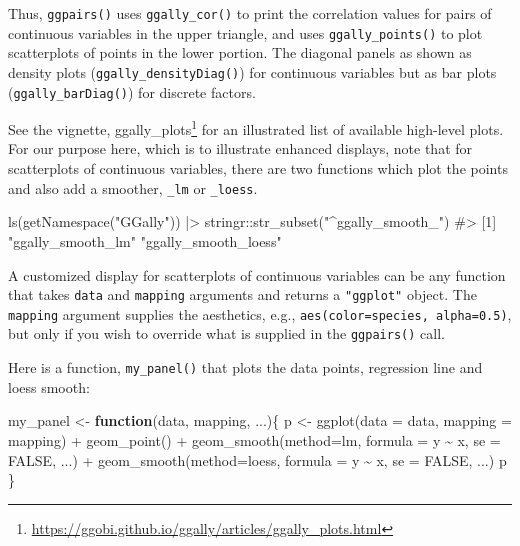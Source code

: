 \documentclass[
  letterpaper,
  10pt,
  krantz2]{krantz}
\makeatletter
\newenvironment{Shaded}{\begin{snugshade}}{\end{snugshade}}
\newcommand{\AttributeTok}[1]{\textcolor[rgb]{0.40,0.45,0.13}{#1}}
\newcommand{\CommentTok}[1]{\textcolor[rgb]{0.37,0.37,0.37}{#1}}
\newcommand{\ConstantTok}[1]{\textcolor[rgb]{0.56,0.35,0.01}{#1}}
\newcommand{\ControlFlowTok}[1]{\textcolor[rgb]{0.00,0.23,0.31}{\textbf{#1}}}
\newcommand{\FunctionTok}[1]{\textcolor[rgb]{0.28,0.35,0.67}{#1}}
\newcommand{\NormalTok}[1]{\textcolor[rgb]{0.00,0.23,0.31}{#1}}
\newcommand{\OtherTok}[1]{\textcolor[rgb]{0.00,0.23,0.31}{#1}}
\newcommand{\SpecialCharTok}[1]{\textcolor[rgb]{0.37,0.37,0.37}{#1}}
\newcommand{\StringTok}[1]{\textcolor[rgb]{0.13,0.47,0.30}{#1}}
\providecommand{\href}[2]{#2\footnote{\url{#1}}}
\newenvironment{kframe}{%
  \medskip{}
  \setlength{\fboxsep}{.8em}
  \def\at@end@of@kframe{}%
  \ifinner\ifhmode%
  \def\at@end@of@kframe{\end{minipage}}%
  \begin{minipage}{\columnwidth}%
  \fi\fi%
  \def\FrameCommand##1{\hskip\@totalleftmargin \hskip-\fboxsep
  \colorbox{shadecolor}{##1}\hskip-\fboxsep
      \hskip-\linewidth \hskip-\@totalleftmargin \hskip\columnwidth}%
  \MakeFramed {\advance\hsize-\width
    \@totalleftmargin\z@ \linewidth\hsize
    \@setminipage}}%
{\par\unskip\endMakeFramed%
  \at@end@of@kframe}
\renewenvironment{Shaded}{\begin{kframe}}{\end{kframe}}
\makeatother
\begin{document}
Thus, \texttt{ggpairs()} uses \texttt{ggally\_cor()} to print the
correlation values for pairs of continuous variables in the upper
triangle, and uses \texttt{ggally\_points()} to plot scatterplots of
points in the lower portion. The diagonal panels as shown as density
plots (\texttt{ggally\_densityDiag()}) for continuous variables but as
bar plots (\texttt{ggally\_barDiag()}) for discrete factors.

See the vignette,
\href{https://ggobi.github.io/ggally/articles/ggally_plots.html}{ggally\_plots}
for an illustrated list of available high-level plots. For our purpose
here, which is to illustrate enhanced displays, note that for
scatterplots of continuous variables, there are two functions which plot
the points and also add a smoother, \texttt{\_lm} or \texttt{\_loess}.

\begin{Shaded}
\begin{Highlighting}[]
\FunctionTok{ls}\NormalTok{(}\FunctionTok{getNamespace}\NormalTok{(}\StringTok{"GGally"}\NormalTok{)) }\SpecialCharTok{|\textgreater{}} 
\NormalTok{  stringr}\SpecialCharTok{::}\FunctionTok{str\_subset}\NormalTok{(}\StringTok{"\^{}ggally\_smooth\_"}\NormalTok{)}
\CommentTok{\#\textgreater{} [1] "ggally\_smooth\_lm"    "ggally\_smooth\_loess"}
\end{Highlighting}
\end{Shaded}

A customized display for scatterplots of continuous variables can be any
function that takes \texttt{data} and \texttt{mapping} arguments and
returns a \texttt{"ggplot"} object. The \texttt{mapping} argument
supplies the aesthetics, e.g., \texttt{aes(color=species,\ alpha=0.5)},
but only if you wish to override what is supplied in the
\texttt{ggpairs()} call.

Here is a function, \texttt{my\_panel()} that plots the data points,
regression line and loess smooth:

\begin{Shaded}
\begin{Highlighting}[]
\NormalTok{my\_panel }\OtherTok{\textless{}{-}} \ControlFlowTok{function}\NormalTok{(data, mapping, ...)\{}
\NormalTok{  p }\OtherTok{\textless{}{-}} \FunctionTok{ggplot}\NormalTok{(}\AttributeTok{data =}\NormalTok{ data, }\AttributeTok{mapping =}\NormalTok{ mapping) }\SpecialCharTok{+} 
    \FunctionTok{geom\_point}\NormalTok{() }\SpecialCharTok{+} 
    \FunctionTok{geom\_smooth}\NormalTok{(}\AttributeTok{method=}\NormalTok{lm, }\AttributeTok{formula =}\NormalTok{ y }\SpecialCharTok{\textasciitilde{}}\NormalTok{ x, }\AttributeTok{se =} \ConstantTok{FALSE}\NormalTok{, ...) }\SpecialCharTok{+}
    \FunctionTok{geom\_smooth}\NormalTok{(}\AttributeTok{method=}\NormalTok{loess, }\AttributeTok{formula =}\NormalTok{ y }\SpecialCharTok{\textasciitilde{}}\NormalTok{ x, }\AttributeTok{se =} \ConstantTok{FALSE}\NormalTok{, ...)}
\NormalTok{  p}
\NormalTok{\}}
\end{Highlighting}
\end{Shaded}
\end{document}
